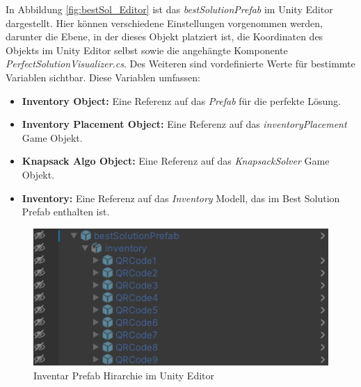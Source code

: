 In Abbildung \ref{fig:bestSol_Editor} ist das \textit{bestSolutionPrefab} im Unity Editor dargestellt. Hier können
verschiedene Einstellungen vorgenommen werden, darunter die Ebene, in der dieses Objekt platziert ist, die Koordinaten
des Objekts im Unity Editor selbst sowie die angehängte Komponente \textit{PerfectSolutionVisualizer.cs}. Des Weiteren
sind vordefinierte Werte für bestimmte Variablen sichtbar. Diese Variablen umfassen:
\begin{itemize}
    \item \textbf{Inventory Object:} Eine Referenz auf das \textit{Prefab} für die perfekte Lösung.
    \item \textbf{Inventory Placement Object:} Eine Referenz auf das \textit{inventoryPlacement} Game Objekt.
    \item \textbf{Knapsack Algo Object:} Eine Referenz auf das \textit{KnapsackSolver} Game Objekt.
    \item \textbf{Inventory:} Eine Referenz auf das \textit{Inventory} Modell, das im Best Solution Prefab enthalten ist.
\end{itemize}

\begin{figure}[h]
    \centering
    \includegraphics[scale=0.8]{images/bestSolPref}
    \caption{Inventar Prefab Hirarchie im Unity Editor}
    \label{fig:InvPref}
\end{figure}

